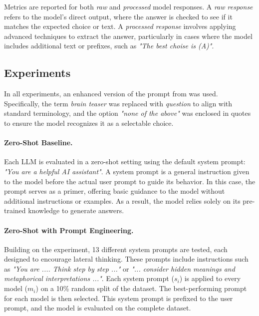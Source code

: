 Metrics are reported for both \textit{raw} and \textit{processed} model responses. A \textit{raw response} refers to the model's direct output, where the answer is checked to see if it matches the expected choice or text. A \textit{processed response} involves applying advanced techniques to extract the answer, particularly in cases where the model includes additional text or prefixes, such as \textit{"The best choise is (A)"}.

\subsection{Experiments}

In all experiments, an enhanced version of the prompt from \textcite{jiangBRAINTEASERLateralThinking2023} was used. Specifically, the term \textit{brain teaser} was replaced with \textit{question} to align with standard terminology, and the option \textit{"none of the above"} was enclosed in quotes to ensure the model recognizes it as a selectable choice.

\paragraph{Zero-Shot Baseline.}
\label{zero-shot-prompt}
Each \ac{LLM} is evaluated in a zero-shot setting using the default system prompt: \textit{"You are a helpful AI assistant"}. A system prompt is a general instruction given to the model before the actual user prompt to guide its behavior. In this case, the prompt serves as a primer, offering basic guidance to the model without additional instructions or examples. As a result, the model relies solely on its pre-trained knowledge to generate answers.

\paragraph{Zero-Shot with Prompt Engineering.}
\label{zero-shot-prompt-engineering}
Building on the  experiment, 13 different system prompts are tested, each designed to encourage lateral thinking. These prompts include instructions such as \textit{"You are {...}. Think step by step {...}"} or \textit{"{...} consider hidden meanings and metaphorical interpretations {...}"}. Each system prompt ($s_i$) is applied to every model ($m_i$) on a 10\% random split of the dataset. The best-performing prompt for each model is then selected. This system prompt is prefixed to the user prompt, and the model is evaluated on the complete dataset.

